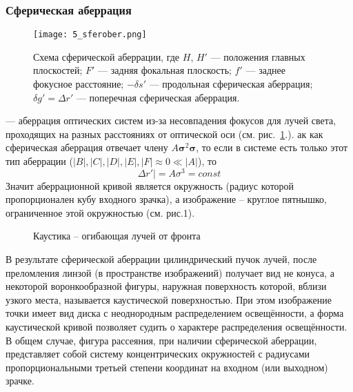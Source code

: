 \subsubsection{Сферическая аберрация}
\begin{figure}[H]
\begin{center}
\texttt{[image: 5\_sferober.png]}
\caption{Схема сферической аберрации, где
	$H$, $H'$ — положения главных плоскостей;
		$F'$  — задняя фокальная плоскость;
		$f'$  — заднее фокусное расстояние;
		$-\delta s'$  — продольная сферическая аберрация;
		$\delta g' = \Delta r'$  — поперечная сферическая аберрация.}
	\label{p1}
	\end{center}
	\end{figure}
	 — аберрация оптических систем из-за несовпадения фокусов для лучей света, проходящих на разных расстояниях от оптической оси (см. рис.~\ref{p1}.).
ак как сферическая аберрация отвечает члену $A\bm{\sigma}^{2}\bm{\sigma}$, то если в системе есть только этот тип аберрации ($|B|,|C|,|D|,|E|,|F|\approx0\ll |A|$), то
\begin{equation*}
\Delta r'| = A\sigma^{3} = const
\end{equation*} 
 Значит аберрационной кривой является окружность (радиус которой пропорционален кубу входного зрачка), а изображение -- круглое пятнышко, ограниченное этой окружностью (см. рис.1).

\begin{wrapfigure}{r}{0.5\textwidth}
\caption{Каустика -- огибающая лучей от фронта}
\end{wrapfigure}
 В результате сферической аберрации цилиндрический пучок лучей, после преломления линзой (в пространстве изображений) получает вид не конуса, а некоторой воронкообразной фигуры, наружная поверхность которой, вблизи узкого места, называется каустической поверхностью. При этом изображение точки имеет вид диска с неоднородным распределением освещённости, а форма каустической кривой позволяет судить о характере распределения освещённости. В общем случае, фигура рассеяния, при наличии сферической аберрации, представляет собой систему концентрических окружностей с радиусами пропорциональными третьей степени координат на входном (или выходном) зрачке.

